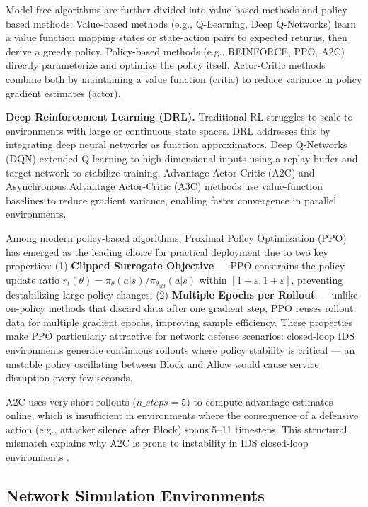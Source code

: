 \documentclass[12pt,a4paper]{report}
\begin{document}
Model-free algorithms are further divided into value-based methods and policy-based methods. Value-based methods (e.g., Q-Learning, Deep Q-Networks) learn a value function mapping states or state-action pairs to expected returns, then derive a greedy policy. Policy-based methods (e.g., REINFORCE, PPO, A2C) directly parameterize and optimize the policy itself. Actor-Critic methods combine both by maintaining a value function (critic) to reduce variance in policy gradient estimates (actor).

\textbf{Deep Reinforcement Learning (DRL).} Traditional RL struggles to scale to environments with large or continuous state spaces. DRL addresses this by integrating deep neural networks as function approximators. Deep Q-Networks (DQN) \cite{mnih2015dqn} extended Q-learning to high-dimensional inputs using a replay buffer and target network to stabilize training. Advantage Actor-Critic (A2C) and Asynchronous Advantage Actor-Critic (A3C) methods use value-function baselines to reduce gradient variance, enabling faster convergence in parallel environments.

Among modern policy-based algorithms, Proximal Policy Optimization (PPO) \cite{schulmanPPO2017} has emerged as the leading choice for practical deployment due to two key properties: (1) \textbf{Clipped Surrogate Objective} --- PPO constrains the policy update ratio $r_t(\theta) = \pi_\theta(a|s)/\pi_{\theta_{old}}(a|s)$ within $[1-\varepsilon, 1+\varepsilon]$, preventing destabilizing large policy changes; (2) \textbf{Multiple Epochs per Rollout} --- unlike on-policy methods that discard data after one gradient step, PPO reuses rollout data for multiple gradient epochs, improving sample efficiency. These properties make PPO particularly attractive for network defense scenarios: closed-loop IDS environments generate continuous rollouts where policy stability is critical --- an unstable policy oscillating between Block and Allow would cause service disruption every few seconds.

A2C uses very short rollouts ($n\_steps = 5$) to compute advantage estimates online, which is insufficient in environments where the consequence of a defensive action (e.g., attacker silence after Block) spans 5--11 timesteps. This structural mismatch explains why A2C is prone to instability in IDS closed-loop environments \cite{colas2019seeds}.

\subsection{Network Simulation Environments}
\end{document}
